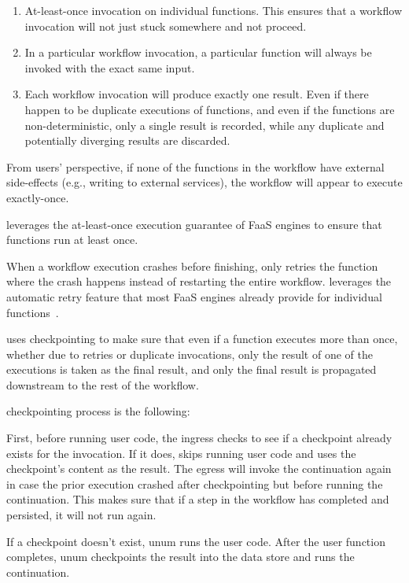 \begin{enumerate}

	\item At-least-once invocation on individual functions. This ensures that a
	workflow invocation will not just stuck somewhere and not proceed.

	\item In a particular workflow invocation, a particular function will
	always be invoked with the exact same input.

	\item Each workflow invocation will produce exactly one result. Even if
	there happen to be duplicate executions of functions, and even if the
	functions are non-deterministic, only a single result is recorded, while
	any duplicate and potentially diverging results are discarded.

\end{enumerate}

From users' perspective, if none of the functions in the workflow have
external side-effects (e.g., writing to external services), the workflow will
appear to execute exactly-once.

\name{} leverages the at-least-once execution guarantee of FaaS engines to
ensure that functions run at least once.

When a workflow execution crashes before finishing, \name{} only retries the
function where the crash happens instead of restarting the entire workflow.
\name{} leverages the automatic retry feature that most FaaS engines already provide
for individual functions~\cite{azure-functions-retry,
google-cloud-functions-retry, aws-lambda-async-invoke}.

\name{} uses checkpointing to make sure that even if a function executes more
than once, whether due to retries or duplicate invocations, only the result of
one of the executions is taken as the final result, and only the final result
is propagated downstream to the rest of the workflow.

\name{} checkpointing process is the following:

First, before running user code, the ingress checks to see if a checkpoint
already exists for the invocation. If it does, \name{} skips running user code
and uses the checkpoint's content as the result. The egress will invoke the
continuation again in case the prior execution crashed after checkpointing but
before running the continuation. This makes sure that if a step in the
workflow has completed and persisted, it will not run again.

If a checkpoint doesn't exist, unum runs the user code. After the user
function completes, unum checkpoints the result into the data store and runs
the continuation.